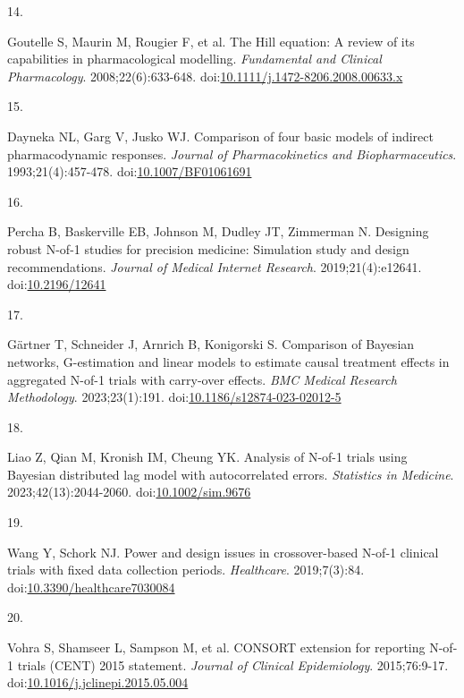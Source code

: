 \documentclass[
  11pt,
]{article}
\newlength{\cslhangindent}
\newlength{\csllabelwidth}
\newenvironment{CSLReferences}[2] %
 {\begin{list}{}{%
  \setlength{\itemindent}{0pt}
  \setlength{\leftmargin}{0pt}
  \setlength{\parsep}{0pt}
  \ifodd #1
   \setlength{\leftmargin}{\cslhangindent}
   \setlength{\itemindent}{-1\cslhangindent}
  \fi
  \setlength{\itemsep}{#2\baselineskip}}}
 {\end{list}}
\newcommand{\CSLLeftMargin}[1]{\parbox[t]{\csllabelwidth}{\strut#1\strut}}
\newcommand{\CSLRightInline}[1]{\parbox[t]{\linewidth - \csllabelwidth}{\strut#1\strut}}
\begin{document}
\begin{CSLReferences}{0}{1}
\CSLLeftMargin{14. }%
\CSLRightInline{Goutelle S, Maurin M, Rougier F, et al. The {H}ill equation: A review of its capabilities in pharmacological modelling. \emph{Fundamental and Clinical Pharmacology}. 2008;22(6):633-648. doi:\href{https://doi.org/10.1111/j.1472-8206.2008.00633.x}{10.1111/j.1472-8206.2008.00633.x}}

\CSLLeftMargin{15. }%
\CSLRightInline{Dayneka NL, Garg V, Jusko WJ. Comparison of four basic models of indirect pharmacodynamic responses. \emph{Journal of Pharmacokinetics and Biopharmaceutics}. 1993;21(4):457-478. doi:\href{https://doi.org/10.1007/BF01061691}{10.1007/BF01061691}}

\CSLLeftMargin{16. }%
\CSLRightInline{Percha B, Baskerville EB, Johnson M, Dudley JT, Zimmerman N. Designing robust {N}-of-1 studies for precision medicine: Simulation study and design recommendations. \emph{Journal of Medical Internet Research}. 2019;21(4):e12641. doi:\href{https://doi.org/10.2196/12641}{10.2196/12641}}

\CSLLeftMargin{17. }%
\CSLRightInline{Gärtner T, Schneider J, Arnrich B, Konigorski S. Comparison of {B}ayesian networks, {G}-estimation and linear models to estimate causal treatment effects in aggregated {N}-of-1 trials with carry-over effects. \emph{BMC Medical Research Methodology}. 2023;23(1):191. doi:\href{https://doi.org/10.1186/s12874-023-02012-5}{10.1186/s12874-023-02012-5}}

\CSLLeftMargin{18. }%
\CSLRightInline{Liao Z, Qian M, Kronish IM, Cheung YK. Analysis of {N}-of-1 trials using {B}ayesian distributed lag model with autocorrelated errors. \emph{Statistics in Medicine}. 2023;42(13):2044-2060. doi:\href{https://doi.org/10.1002/sim.9676}{10.1002/sim.9676}}

\CSLLeftMargin{19. }%
\CSLRightInline{Wang Y, Schork NJ. Power and design issues in crossover-based {N}-of-1 clinical trials with fixed data collection periods. \emph{Healthcare}. 2019;7(3):84. doi:\href{https://doi.org/10.3390/healthcare7030084}{10.3390/healthcare7030084}}

\CSLLeftMargin{20. }%
\CSLRightInline{{Vohra S, Shamseer L, Sampson M, et al.} {CONSORT} extension for reporting {N}-of-1 trials ({CENT}) 2015 statement. \emph{Journal of Clinical Epidemiology}. 2015;76:9-17. doi:\href{https://doi.org/10.1016/j.jclinepi.2015.05.004}{10.1016/j.jclinepi.2015.05.004}}


\end{CSLReferences}
\end{document}
